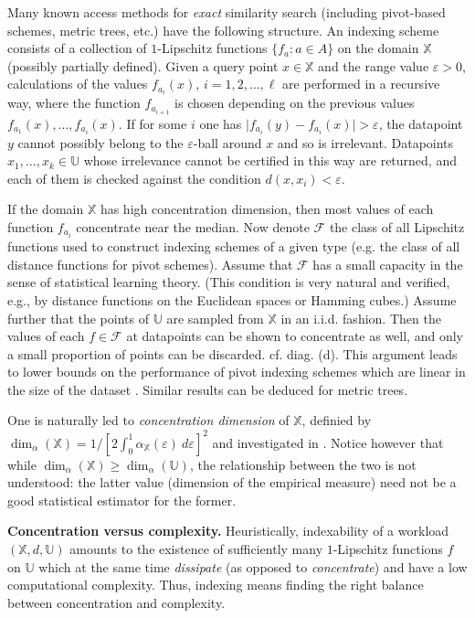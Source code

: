 \documentclass[12pt]{article}
\newcommand{\abs}[1]{\lvert#1\rvert}
\def\e{\varepsilon}
\begin{document}
\smallskip
{}
Many known access methods for {\em exact} similarity search (including pivot-based schemes, metric trees, etc.) have the following structure. An indexing scheme consists of a collection of  $1$-Lipschitz functions $\{f_a\colon a\in A\}$ on the domain $\mathbb X$ (possibly partially defined). Given a query point $x\in{\mathbb X}$ and the range value $\e>0$, calculations of the values $f_{a_i}(x)$, $i=1,2,\ldots,\ell$ are performed in a recursive way, where the function $f_{a_{i+1}}$ is chosen depending on the previous values $f_{a_1}(x),\ldots, f_{a_i}(x)$. If for some $i$ one has $\abs{f_{a_i}(y)-f_{a_i}(x)}>\e$, the datapoint $y$ cannot possibly belong to the $\e$-ball around $x$ and so is irrelevant. Datapoints $x_1,\ldots,x_k\in{\mathbb U}$ whose irrelevance cannot be certified in this way are returned, and each of them is checked against the condition $d(x,x_i)<\e$. 

If the domain $\mathbb X$ has high concentration dimension, then most values of each function $f_{a_i}$ concentrate near the median. Now denote $\mathscr F$  the class of all Lipschitz functions used to construct indexing schemes of a given type (e.g. the class of all distance functions for pivot schemes). Assume that $\mathscr F$ has a small capacity in the sense of statistical learning theory. (This condition is very natural and verified, e.g., by distance functions on the Euclidean spaces or Hamming cubes.)
Assume further that the points of $\mathbb U$ are sampled from $\mathbb X$ in an i.i.d. fashion. Then the values of each $f\in{\mathscr F}$ at datapoints can be shown to concentrate as well, and only a small proportion of points can be discarded. cf. diag. (d). This argument leads to lower bounds on the performance of pivot indexing schemes which are linear in the size of the dataset \cite{VolPest09}. Similar results can be deduced for metric trees. 

One is naturally led to {\em concentration dimension} of $\mathbb X$, definied by $\dim_{\alpha}({\mathbb X})=1/{\left[2\int_0^1 \alpha_{\mathbb X}(\e)~d\e\right]^2}$ and investigated in \cite{pestov0708}. Notice however that while $\dim_{\alpha}({\mathbb X})\geq \dim_{\alpha}({\mathbb U})$, the relationship between the two is not understood: the latter value (dimension of the empirical measure) need not be a good statistical estimator for the former.

\smallskip
\noindent
{\bf Concentration versus complexity.}
Heuristically, indexability of a workload $({\mathbb X},d,{\mathbb U})$ amounts to the existence of sufficiently many $1$-Lipschitz functions $f$ on $\mathbb U$ which at the same time {\em dissipate} (as opposed to {\em concentrate}) and have a low computational complexity. Thus, indexing means finding the right balance between concentration and complexity.
\end{document}
